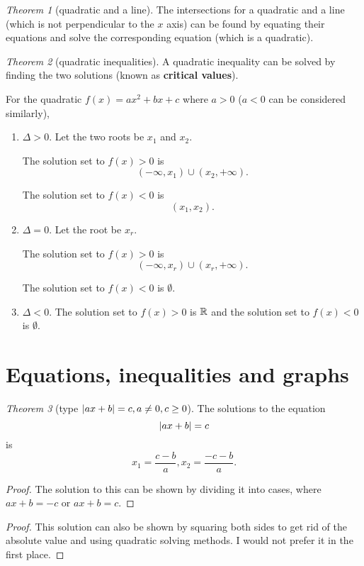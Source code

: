 \documentclass[8pt]{article}
\theoremstyle{remark}
\newtheorem{theorem}{Theorem}[section]
\begin{document}
        \begin{theorem}[quadratic and a line]
            The intersections for a quadratic and a line (which is not perpendicular to the $x$ axis) can be found by equating their equations and solve the corresponding equation (which is a quadratic).
        \end{theorem}

        \begin{theorem}[quadratic inequalities]
            A quadratic inequality can be solved by finding the two solutions (known as \textbf{critical values}).

            For the quadratic $f(x) = ax^2 + bx + c$ where $a > 0$ ($a < 0$ can be considered similarly),
            \begin{enumerate}
                \item $\Delta > 0$. Let the two roots be $x_1$ and $x_2$.
                
                The solution set to $f(x) > 0$ is
                $$
                    (-\infty, x_1) \cup (x_2, +\infty).
                $$

                The solution set to $f(x) < 0$ is
                $$
                    (x_1, x_2).
                $$

                \item $\Delta = 0$. Let the root be $x_r$.
                
                The solution set to $f(x) > 0$ is
                $$
                    (-\infty, x_r) \cup (x_r, +\infty).
                $$

                The solution set to $f(x) < 0$ is $\emptyset$.

                \item $\Delta < 0$. The solution set to $f(x) > 0$ is $\mathbb{R}$ and the solution set to $f(x) < 0$ is $\emptyset$.
            \end{enumerate}
        \end{theorem}

    \section{Equations, inequalities and graphs}
        \begin{theorem}[type $\left\lvert ax + b \right\rvert = c, a \neq 0, c \geq 0$]
            The solutions to the equation
            $$
                \left\lvert ax + b \right\rvert = c
            $$
            is
            $$
                x_1 = \frac{c - b}{a}, x_2 = \frac{-c -b}{a}.
            $$

            \begin{proof}
                The solution to this can be shown by dividing it into cases, where $ax + b = -c$ or $ax + b = c$.
            \end{proof}

            \begin{proof}
                This solution can also be shown by squaring both sides to get rid of the absolute value and using quadratic solving methods. I would not prefer it in the first place.
            \end{proof}
        \end{theorem}
\end{document}
